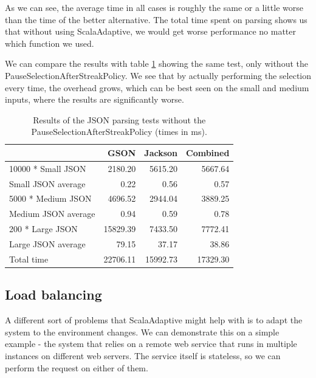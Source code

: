 As we can see, the average time in all cases is roughly the same or a little worse than the time of the better alternative. The total time spent on parsing shows us that without using ScalaAdaptive, we would get worse performance no matter which function we used.

We can compare the results with table \ref{tab:json_parsing_results_no_policy} showing the same test, only without the PauseSelectionAfterStreakPolicy. We see that by actually performing the selection every time, the overhead grows, which can be best seen on the small and medium inputs, where the results are significantly worse.

\begin{table}[h!]
		\captionsetup{justification=centering,margin=0.5cm}
	\bgroup
	\def\arraystretch{1.5}%
	\begin{center}
		\begin{tabular}{ | l | r | r | r | }
			\hline
			& \textbf{GSON} & \textbf{Jackson} & \textbf{Combined} \\ \hline
10000 * Small JSON  & 2180.20       & 5615.20          & 5667.64           \\ \hline
Small JSON average  & 0.22          & 0.56             & 0.57              \\ \hline
5000 * Medium JSON  & 4696.52       & 2944.04          & 3889.25           \\ \hline
Medium JSON average & 0.94          & 0.59             & 0.78              \\ \hline
200 * Large JSON    & 15829.39      & 7433.50          & 7772.41           \\ \hline
Large JSON average  & 79.15         & 37.17            & 38.86             \\ \hline
Total time          & 22706.11      & 15992.73         & 17329.30          \\ \hline
		\end{tabular}
	\end{center}
	\egroup
	\caption{Results of the JSON parsing tests without the PauseSelectionAfterStreakPolicy (times in ms).}
	\label{tab:json_parsing_results_no_policy}
\end{table}

\subsection{Load balancing}

A different sort of problems that ScalaAdaptive might help with is to adapt the system to the environment changes. We can demonstrate this on a simple example - the system that relies on a remote web service that runs in multiple instances on different web servers. The service itself is stateless, so we can perform the request on either of them. 


